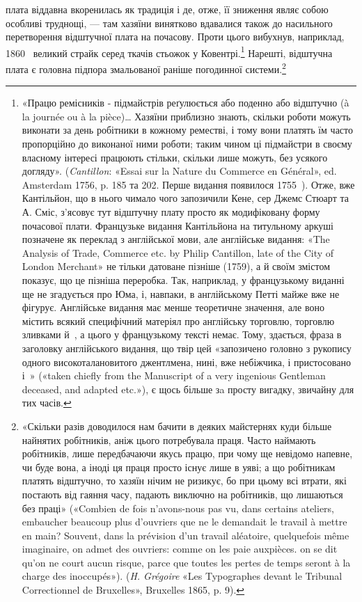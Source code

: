 плата віддавна вкоренилась як традиція і де, отже, її зниження
являє собою особливі труднощі, — там хазяїни винятково вдавалися
також до насильного перетворення відштучної плата на почасову.
Проти цього вибухнув, наприклад, 1860~ великий страйк
серед ткачів стьожок у Ковентрі.\footnote{
«Працю ремісників - підмайстрів реґулюється або поденно або
відштучно (à la journée ou à la pièce)\dots{} Хазяїни приблизно знають,
скільки роботи можуть виконати за день робітники в кожному реместві,
і тому вони платять їм часто пропорційно до виконаної ними роботи;
таким чином ці підмайстри в своєму власному інтересі працюють стільки,
скільки лише можуть, без усякого догляду». (\emph{Cantillon}: «Essai sur la
Nature du Commerce en Général», ed. Amsterdam 1756, p. 185 та 202. Перше видання появилося 1755~). Отже, вже Кантільйон, що в нього
чимало чого запозичили Кене, сер Джемс Стюарт та А. Сміс, з'ясовує
тут відштучну плату просто як модифіковану форму почасової плати.
Французьке видання Кантільйона на титульному аркуші позначене як
переклад з англійської мови, але англійське видання: «The Analysis
of Trade, Commerce etc. by Philip Cantillon, late of the City of London
Merchant» не тільки датоване пізніше (1759), а й своїм змістом показує,
що це пізніша переробка. Так, наприклад, у французькому виданні ще
не згадується про Юма, і, навпаки, в англійському Петті майже вже не
фігурує. Англійське видання має менше теоретичне значення, але воно
містить всякий специфічний матеріял про англійську торговлю, торговлю
зливками й~, а цього у французькому тексті немає. Тому, здається,
фраза в заголовку англійського видання, що твір цей «запозичено головно
з рукопису одного високоталановитого джентлмена, нині, вже небіжчика,
і пристосовано і~» («taken chiefly from the Manuscript of
a very ingenious Gentleman deceased, and adapted etc.»), є щось більше
зa просту вигадку, звичайну для тих часів.
} Нарешті, відштучна плата
є головна підпора змальованої раніше погодинної системи.\footnote{
«Скільки разів доводилося нам бачити в деяких майстернях куди
більше найнятих робітників, аніж цього потребувала праця. Часто наймають
робітників, лише передбачаючи якусь працю, при чому ще невідомо
напевне, чи буде вона, а іноді ця праця просто існує лише в уяві;
а що робітникам платять відштучно, то хазяїн нічим не ризикує, бо при
цьому всі втрати, які постають від гаяння часу, падають виключно на
робітників, що лишаються без праці» («Combien de fois n’avons-nous
pas vu, dans certains ateliers, embaucher beaucoup plus d’ouvriers que
ne le demandait le travail à mettre en main? Souvent, dans la prévision
d’un travail aléatoire, quelquefois même imaginaire, on admet des ouvriers:
comme on les paie auxpièces. on se dit qu’on ne court aucun risque, parce
que toutes les pertes de temps seront à la charge des inoccupés»). (\emph{H. Grégoire}
«Les Typographes devant le Tribunal Correctionnel de Bruxelles»,
Bruxelles 1865, p. 9).
}

